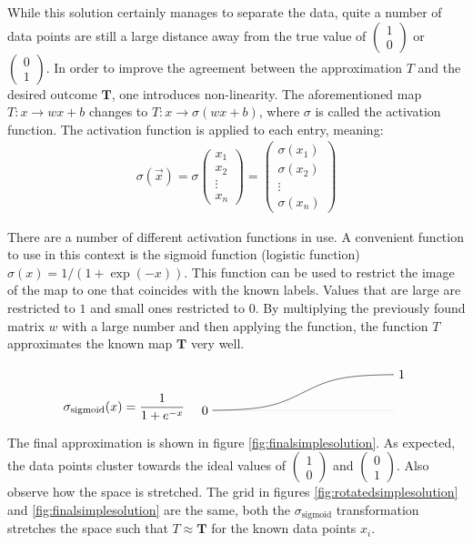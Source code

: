 \documentclass[a4paper, justified]{tufte-handout}
\begin{document}
While this solution certainly manages to separate the data, quite a number of data points are still a large distance away from the true value of $(\begin{smallmatrix} 1\\0 \end{smallmatrix})$ or $(\begin{smallmatrix} 0\\1\end{smallmatrix})$. In order to improve the agreement between the approximation $T$ and the desired outcome $\mathbf{T}$, one introduces non-linearity. The aforementioned map $T: x\to wx+b$ changes to $T: x\to \sigma(wx+b)$, where $\sigma$ is called the activation function. The activation function is applied to each entry, meaning:
\begin{align}
\sigma(\vec{x}) = \sigma \begin{pmatrix} x_1 \\ x_2 \\ \vdots\\ x_n\end{pmatrix} = \begin{pmatrix} \sigma(x_1)\\ \sigma(x_2) \\\vdots\\ \sigma (x_n)\end{pmatrix}
\end{align}

There are a number of different activation functions in use. A convenient function to use in this context is the sigmoid function (logistic function) $\sigma(x) = 1/(1+\exp(-x))$. This function can be used to restrict the image of the map to one that coincides with the known labels. Values that are large are restricted to $1$ and small ones restricted to $0$. By multiplying the previously found matrix $w$ with a large number and then applying the function, the function $T$ approximates the known map $\mathbf{T}$ very well.

\begin{align}
\sigma_\text{sigmoid}(x) &= \frac1{1+e^{-x}}& \begin{tikzpicture}[baseline=0cm] 
\draw[gray!20] (-2.5, 0) -- (2.5, 0);
\draw[domain=-5:5, samples=51, xscale=0.5] plot (\x, {1/(1+exp(-\x))});
\draw (-2.5, 0) node[left] {$0$} (2.5, 1) node [right] {$1$};
\end{tikzpicture}
\end{align}

The final approximation is shown in figure \ref{fig:finalsimplesolution}. As expected, the data points cluster towards the ideal values of $(\begin{smallmatrix}1\\0\end{smallmatrix})$ and $(\begin{smallmatrix} 0\\1\end{smallmatrix})$. Also observe how the space is stretched. The grid in figures \ref{fig:rotatedsimplesolution} and \ref{fig:finalsimplesolution} are the same, both the $\sigma_\text{sigmoid}$ transformation stretches the space such that $T\approx \mathbf{T}$ for the known data points $x_i$.
\end{document}
